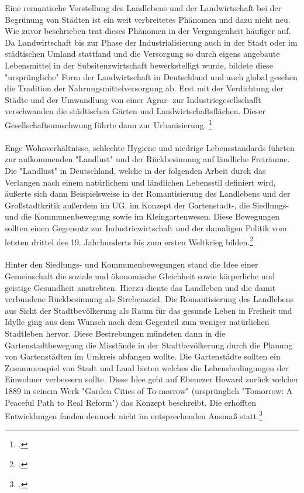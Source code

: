 \documentclass{scrartcl}
\begin{document}
Eine romantische Vorstellung des Landlebens und der Landwirtschaft bei der Begrünung von Städten ist ein weit verbreitetes Phänomen und dazu nicht neu. Wie zuvor beschrieben trat dieses Phänomen in der Vergangenheit häufiger auf. Da Landwirtschaft bis zur Phase der Industrialisierung auch in der Stadt oder im städtischen Umland stattfand und die Versorgung so durch eigens angebaute Lebensmittel in der Subsitenzwirtschaft bewerkstelligt wurde, bildete diese "ursprüngliche" Form der Landwirtschaft in Deutschland und auch global gesehen die Tradition der Nahrungsmittelversorgung ab. Erst mit der Verdichtung der Städte und der Umwandlung von einer Agrar- zur Industriegesellschafft verschwanden die städtischen Gärten und Landwirtschaftsflächen. Dieser Gesellschaftsumschwung führte dann zur Urbanisierung. \footcite[Vgl.][S. 32ff]{Egnolff2015DieIdeal}\\
\\
Enge Wohnverhältnisse, schlechte Hygiene und niedrige Lebensstandards führten zur aufkommenden "Landlust" und der Rückbesinnung auf ländliche Freiräume. Die "Landlust" in Deutschland, welche in der folgenden Arbeit durch das Verlangen nach einem natürlichem und ländlichen Lebensstil definiert wird, äußerte sich dann Beispielsweise in der Romantisierung des Landlebens und der Großstadtkritik außerdem im UG, im Konzept der Gartenstadt-, die Siedlungs- und die Kommunenbewegung sowie im Kleingartenwesen. Diese Bewegungen sollten einen Gegensatz zur Industriewirtschaft und der damaligen Politik vom letzten drittel des 19. Jahrhunderts bis zum ersten Weltkrieg bilden.\footcite[Vgl.][S. 35]{Egnolff2015DieIdeal}\\
\\
Hinter den Siedlungs- und Kommunenbewegungen stand die Idee einer Gemeinschaft die soziale und ökonomische Gleichheit sowie körperliche und geistige Gesundheit anstrebten. Hierzu diente das Landleben und die damit verbundene Rückbesinnung als Strebensziel. Die Romantisierung des Landlebens aus Sicht der Stadtbevölkerung als Raum für das gesunde Leben in Freiheit und Idylle ging aus dem Wunsch nach dem Gegenteil zum weniger natürlichen Stadtleben hervor. Diese Bestrebungen mündeten dann in die Gartenstadtbewegung die Misstände in der Stadtbevölkerung durch die Planung von Gartenstädten im Umkreis abfangen wollte. Die Gartenstädte sollten ein Zusammenspiel von Stadt und Land bieten welches die Lebensbedingungen der Einwohner verbessern sollte. Diese Idee geht auf Ebenezer Howard zurück welcher 1889 in seinem Werk "Garden Cities of To-morrow" (ursprünglich "Tomorrow: A Peaceful Path to Real Reform") das Konzept beschreibt. Die erhofften Entwicklungen fanden dennoch nicht im entsprechenden Ausmaß statt.\footcite[Vgl.][S. 36]{Egnolff2015DieIdeal}
\end{document}
